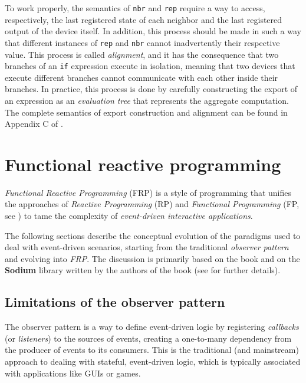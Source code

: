To work properly, the semantics of \texttt{nbr} and \texttt{rep} require a way to access, respectively, the last registered state of each neighbor and the last registered output of the device itself.
%
In addition, this process should be made in such a way that different instances of \texttt{rep} and \texttt{nbr} cannot inadvertently  their respective value.
%
This process is called \textit{alignment}, and it has the consequence that two branches of an \texttt{if} expression execute in isolation, meaning that two devices that execute different branches cannot communicate with each other inside their branches.
%
In practice, this process is done by carefully constructing the export of an expression as an \textit{evaluation tree} that represents the aggregate computation.
%
The complete semantics of export construction and alignment can be found in Appendix C of \cite{10.1145/3177774}.

\section{Functional reactive programming}

\textit{Functional Reactive Programming} (FRP) is a style of programming that unifies the approaches of \textit{Reactive Programming} (RP) and \textit{Functional Programming} (FP, see ) to tame the complexity of \textit{event-driven interactive applications}.

The following sections describe the conceptual evolution of the paradigms used to deal with event-driven scenarios, starting from the traditional \textit{observer pattern} and evolving into \textit{FRP}.
%
The discussion is primarily based on the book \cite{blackheath2016functional} and on the \textbf{Sodium} library written by the authors of the book (see  for further details).

\subsection{Limitations of the observer pattern}
\label{sec:observer}

The observer pattern is a way to define event-driven logic by registering \textit{callbacks} (or \textit{listeners}) to the sources of events, creating a one-to-many dependency from the producer of events to its consumers.
%
This is the traditional (and mainstream) approach to dealing with stateful, event-driven logic, which is typically associated with applications like GUIs or games.

